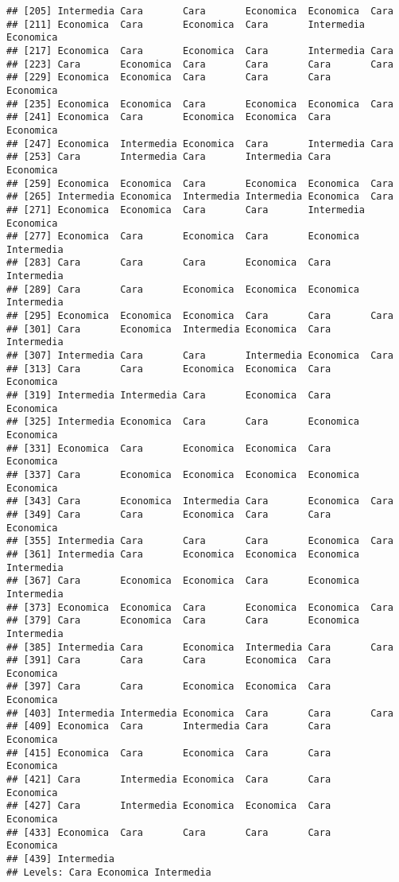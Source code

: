 \documentclass[
]{article}
\begin{document}
\begin{verbatim}
## [205] Intermedia Cara       Cara       Economica  Economica  Cara      
## [211] Economica  Cara       Economica  Cara       Intermedia Economica 
## [217] Economica  Cara       Economica  Cara       Intermedia Cara      
## [223] Cara       Economica  Cara       Cara       Cara       Cara      
## [229] Economica  Economica  Cara       Cara       Cara       Economica 
## [235] Economica  Economica  Cara       Economica  Economica  Cara      
## [241] Economica  Cara       Economica  Economica  Cara       Economica 
## [247] Economica  Intermedia Economica  Cara       Intermedia Cara      
## [253] Cara       Intermedia Cara       Intermedia Cara       Economica 
## [259] Economica  Economica  Cara       Economica  Economica  Cara      
## [265] Intermedia Economica  Intermedia Intermedia Economica  Cara      
## [271] Economica  Economica  Cara       Cara       Intermedia Economica 
## [277] Economica  Cara       Economica  Cara       Economica  Intermedia
## [283] Cara       Cara       Cara       Economica  Cara       Intermedia
## [289] Cara       Cara       Economica  Economica  Economica  Intermedia
## [295] Economica  Economica  Economica  Cara       Cara       Cara      
## [301] Cara       Economica  Intermedia Economica  Cara       Intermedia
## [307] Intermedia Cara       Cara       Intermedia Economica  Cara      
## [313] Cara       Cara       Economica  Economica  Cara       Economica 
## [319] Intermedia Intermedia Cara       Economica  Cara       Economica 
## [325] Intermedia Economica  Cara       Cara       Economica  Economica 
## [331] Economica  Cara       Economica  Economica  Cara       Economica 
## [337] Cara       Economica  Economica  Economica  Economica  Economica 
## [343] Cara       Economica  Intermedia Cara       Economica  Cara      
## [349] Cara       Cara       Economica  Cara       Cara       Economica 
## [355] Intermedia Cara       Cara       Cara       Economica  Cara      
## [361] Intermedia Cara       Economica  Economica  Economica  Intermedia
## [367] Cara       Economica  Economica  Cara       Economica  Intermedia
## [373] Economica  Economica  Cara       Economica  Economica  Cara      
## [379] Cara       Economica  Cara       Cara       Economica  Intermedia
## [385] Intermedia Cara       Economica  Intermedia Cara       Cara      
## [391] Cara       Cara       Cara       Economica  Cara       Economica 
## [397] Cara       Cara       Economica  Economica  Cara       Economica 
## [403] Intermedia Intermedia Economica  Cara       Cara       Cara      
## [409] Economica  Cara       Intermedia Cara       Cara       Economica 
## [415] Economica  Cara       Economica  Cara       Cara       Economica 
## [421] Cara       Intermedia Economica  Cara       Cara       Economica 
## [427] Cara       Intermedia Economica  Economica  Cara       Economica 
## [433] Economica  Cara       Cara       Cara       Cara       Economica 
## [439] Intermedia
## Levels: Cara Economica Intermedia
\end{verbatim}
\end{document}
